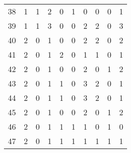 \begin{longtable}{cp{1.5cm}p{1.5cm}p{1.5cm}p{1.5cm}p{1.5cm}p{1.5cm}p{1.5cm}p{1.5cm}p{1.5cm}}
38 &                      1 &                      1 &                      2 &                         0 &                         1 &                         0 &                      0 &                      0 &                      1 \\
39 &                      1 &                      1 &                      3 &                         0 &                         0 &                         2 &                      2 &                      0 &                      3 \\
40 &                      2 &                      0 &                      1 &                         0 &                         0 &                         2 &                      2 &                      0 &                      2 \\
41 &                      2 &                      0 &                      1 &                         2 &                         0 &                         1 &                      1 &                      0 &                      1 \\
42 &                      2 &                      0 &                      1 &                         0 &                         0 &                         2 &                      0 &                      1 &                      2 \\
43 &                      2 &                      0 &                      1 &                         1 &                         0 &                         3 &                      2 &                      0 &                      1 \\
44 &                      2 &                      0 &                      1 &                         1 &                         0 &                         3 &                      2 &                      0 &                      1 \\
45 &                      2 &                      0 &                      1 &                         0 &                         0 &                         2 &                      0 &                      1 &                      2 \\
46 &                      2 &                      0 &                      1 &                         1 &                         1 &                         1 &                      0 &                      1 &                      0 \\
47 &                      2 &                      0 &                      1 &                         1 &                         1 &                         1 &                      1 &                      1 &                      1 \\

\end{longtable}
